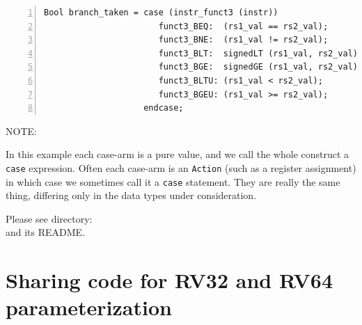 {\footnotesize
\begin{Verbatim}[frame=single, numbers=left, label=from src\_Common/Fn\_EX\_Control.bsv]
Bool branch_taken = case (instr_funct3 (instr))
                       funct3_BEQ:  (rs1_val == rs2_val);
                       funct3_BNE:  (rs1_val != rs2_val);
                       funct3_BLT:  signedLT (rs1_val, rs2_val);
                       funct3_BGE:  signedGE (rs1_val, rs2_val);
                       funct3_BLTU: (rs1_val < rs2_val);
                       funct3_BGEU: (rs1_val >= rs2_val);
                    endcase;
\end{Verbatim}
}


\vspace{1ex}

NOTE: 

\vspace{1ex}


In this example each case-arm is a pure value, and we call the whole
construct a \verb|case| expression.  Often each case-arm is an
\verb|Action| (such as a register assignment) in which case we
sometimes call it a \verb|case| statement.  They are really the same
thing, differing only in the data types under consideration.

\Beginexercise

Please see directory:  \\
and its README.
\Endexercise


\section{Sharing code for RV32 and RV64 {\via} parameterization}

\label{BSV_Paramterizing_XLEN}

